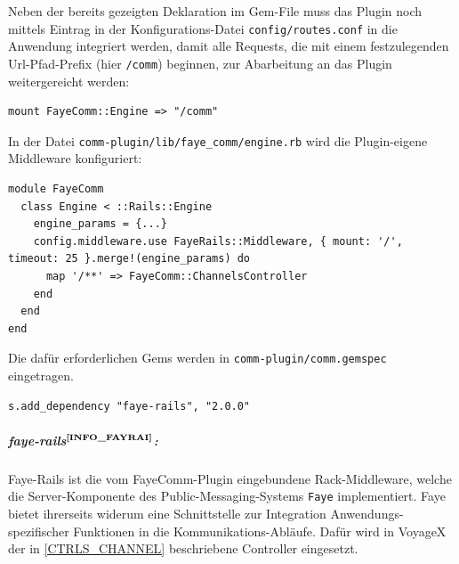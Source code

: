 Neben der bereits gezeigten Deklaration im Gem-File muss das Plugin noch mittels Eintrag in der Konfigurations-Datei \texttt{config/routes.conf} in die Anwendung integriert werden, damit alle Requests, die mit einem festzulegenden Url-Pfad-Prefix (hier \texttt{/comm}) beginnen, zur Abarbeitung an das Plugin weitergereicht werden:
\begin{lstlisting}[frame=single,xleftmargin=0pt,numbers=none]
  mount FayeComm::Engine => "/comm"
\end{lstlisting}
In der Datei \texttt{comm-plugin/lib/faye\_comm/engine.rb} wird die Plugin-eigene Middleware konfiguriert: 
\lstset{language=CoffeeScript}
\begin{lstlisting}[frame=single,xleftmargin=0pt,numbers=none]
module FayeComm
  class Engine < ::Rails::Engine
  	engine_params = {...}
    config.middleware.use FayeRails::Middleware, { mount: '/', timeout: 25 }.merge!(engine_params) do
      map '/**' => FayeComm::ChannelsController
    end
  end
end
\end{lstlisting}
Die dafür erforderlichen Gems werden in \texttt{comm-plugin/comm.gemspec} eingetragen.
\lstset{language=CoffeeScript}
\begin{lstlisting}[frame=single,xleftmargin=0pt,numbers=none]
  s.add_dependency "faye-rails", "2.0.0"
\end{lstlisting}

\subparagraph{faye-rails$^{\textbf{\ref{INFO_FAYRAI}}}$:}\label{FAYERAILS}%
\addtocounter{footnote}{1}%
Faye-Rails ist die vom FayeComm-Plugin eingebundene Rack-Middleware, welche
die Server-Komponente des Public-Messaging-Systems \texttt{Faye} implementiert. Faye bietet ihrerseits widerum eine Schnittstelle zur Integration Anwendungs-spezifischer Funktionen in die Kommunikations-Abläufe. Dafür wird in VoyageX der in \ref{CTRLS_CHANNEL} beschriebene Controller eingesetzt.
 
